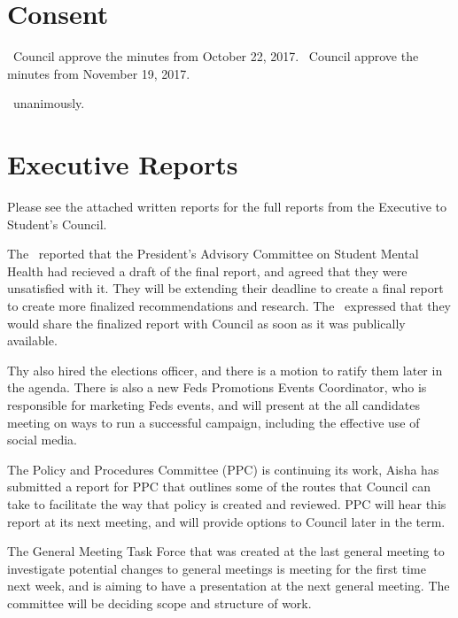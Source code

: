 \section*{Consent}

\begin{motion}
    \birt\ Council approve the minutes from October 22, 2017.
    \bifrt\ Council approve the minutes from November 19, 2017.
    \movers{\seneca}{\lauren}

    \carries\ unanimously.
\end{motion}

\section*{Executive Reports}

Please see the attached written reports for the full reports from the Executive
to Student's Council. 

\begin{information}

    The \pres\ reported that the President’s Advisory Committee on Student
    Mental Health had recieved a draft of the final report, and agreed that
    they were unsatisfied with it. They will be extending their deadline to
    create a final report to create more finalized recommendations and
    research. The \pres\ expressed that they would share the finalized report
    with Council as soon as it was publically available.

    Thy also hired the elections officer, and there is a motion to ratify them
    later in the agenda. There is also a new Feds Promotions Events 
    Coordinator, who is responsible for marketing Feds events, and will present
    at the all candidates meeting on ways to run a successful campaign, 
    including the effective use of social media. 

    The Policy and Procedures Committee (PPC) is continuing its work, Aisha has
    submitted a report for PPC that outlines some of the routes that Council 
    can take to facilitate the way that policy is created and reviewed. PPC 
    will hear this report at its next meeting, and will provide options to
    Council later in the term. 

    The General Meeting Task Force that was created at the last general meeting
    to investigate potential changes to general meetings is meeting for the 
    first time next week, and is aiming to have a presentation at the next
    general meeting. The committee will be deciding scope and structure of
    work.

\end{information}


